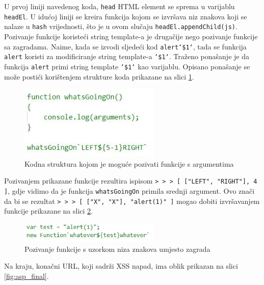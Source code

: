 \documentclass[12pt, oneside, onecolumn]{book}
\begin{document}
{U prvoj liniji navedenog koda, \texttt{head} HTML element se sprema u varijablu \texttt{headEl}. U idućoj liniji se kreira funkcija kojom se izvršava niz znakova koji se nalaze u \texttt{hash} vrijednosti, što je u ovom slučaju \texttt{headEl.appendChild(js)}. Pozivanje funkcije koristeći string template-a je drugačije nego pozivanje funkcije sa zagradama. Naime, kada se izvodi sljedeći kod \texttt{alert`\${1}`}, tada se funkcija \texttt{alert} koristi za modificiranje string template-a \texttt{`\${1}`}. Traženo ponašanje je da funkcija \texttt{alert} primi string template \texttt{`\${1}`} kao varijablu. Opisano ponašanje se može postići korištenjem strukture koda prikazane na slici \ref{fig:asp_nf}.

\begin{figure}[H]
	\begin{center}
		\includegraphics[width=0.6\textwidth]{asp_nf.jpg}
		\caption{Kodna struktura kojom je moguće pozivati funkcije s argumentima} \label{fig:asp_nf}
	\end{center}
\end{figure}

Pozivanjem prikazane funkcije rezultira ispisom \texttt{> > > [ ["LEFT", "RIGHT"], 4 ]}, gdje vidimo da je funkcija \texttt{whatsGoingOn} primila srednji argument. Ovo znači da bi se rezultat \texttt{> > > [ ["X", "X"], "alert(1)" ]} mogao dobiti izvršavanjem funkcije prikazane na slici \ref{fig:asp_funf}.

\begin{figure}[H]
	\begin{center}
		\includegraphics[width=0.6\textwidth]{asp_funf.jpg}
		\caption{Pozivanje funkcije s uzorkom niza znakova umjesto zagrada} \label{fig:asp_funf}
	\end{center}
\end{figure}

Na kraju, konačni URL, koji sadrži XSS napad, ima oblik prikazan na slici \ref{fig:asp_final}.

}
\end{document}
